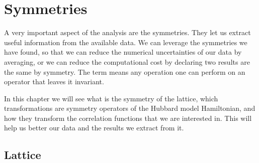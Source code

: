 
\chapter{Symmetries}
\label{sec:symmetries}

A very important aspect of the analysis are the symmetries. They let us extract useful information from the available data. We can leverage the symmetries we have found, so that we can reduce the numerical uncertainties of our data by averaging, or we can reduce the computational cost by declaring two results are the same by symmetry. The term means any operation one can perform on an operator that leaves it invariant.

In this chapter we will see what is the symmetry of the lattice, which transformations are symmetry operators of the Hubbard model Hamiltonian, and how they transform the correlation functions that we are interested in. This will help us better our data and the results we extract from it.

\section{Lattice}
\label{sec:lattice}

